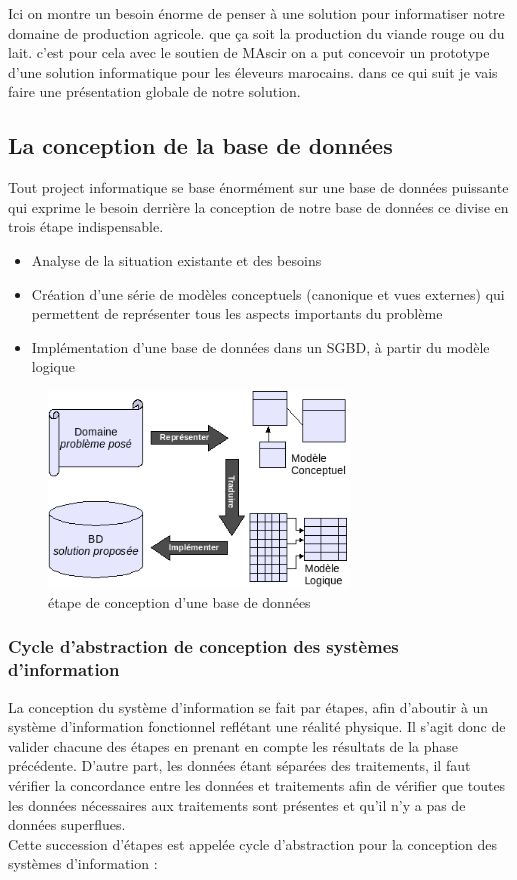 \documentclass[11pt, a4paper, twoside]{book}
\begin{document}
Ici on montre un besoin énorme de penser à une solution pour informatiser notre domaine de production agricole. que ça soit la production du viande rouge ou du lait. c'est pour cela avec le soutien de MAscir on a put concevoir un prototype d'une solution informatique pour les éleveurs marocains. dans ce qui suit je vais faire une présentation globale de notre solution.

\subsection{La conception de la base de données}
Tout project informatique se base énormément sur une base de données puissante qui exprime le besoin derrière la conception de notre base de données ce divise en trois étape indispensable.
\begin{itemize}
\item Analyse de la situation existante et des besoins
\item Création d'une série de modèles conceptuels (canonique et vues externes) qui permettent de représenter tous les aspects importants du problème
\item Implémentation d'une base de données dans un SGBD, à partir du modèle logique

\end{itemize}

\begin{figure}[H]
\centering
\includegraphics[width=8cm]{db}
\caption{étape de conception d'une base de données}
\end{figure}

\subsubsection{Cycle d'abstraction de conception des systèmes d'information}
La conception du système d'information se fait par étapes, afin d'aboutir à un système d'information fonctionnel reflétant une réalité physique. Il s'agit donc de valider chacune des étapes en prenant en compte les résultats de la phase précédente. D'autre part, les données étant séparées des traitements, il faut vérifier la concordance entre les données et traitements afin de vérifier que toutes les données nécessaires aux traitements sont présentes et qu'il n'y a pas de données superflues.\\
Cette succession d'étapes est appelée cycle d'abstraction pour la conception des systèmes d'information :
\end{document}
